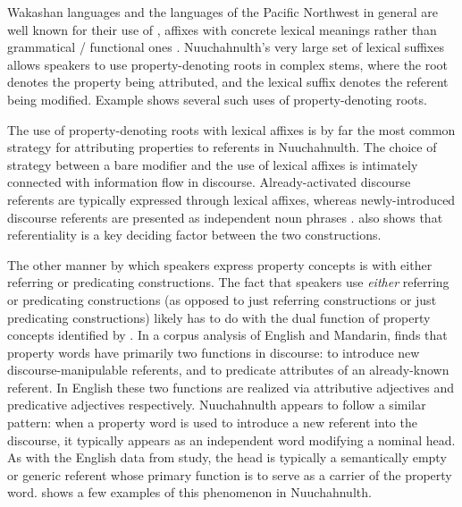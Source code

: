 Wakashan languages and the languages of the Pacific Northwest in general are well known for their use of , affixes with concrete lexical meanings rather than grammatical / functional ones \parencite{Mithun1997}.  Nuuchahnulth's very large set of lexical suffixes allows speakers to use property-denoting roots in complex stems, where the root denotes the property being attributed, and the lexical suffix denotes the referent being modified. Example  shows several such uses of property-denoting roots.


\noindent The use of property-denoting roots with lexical affixes is by far the most common strategy for attributing properties to referents in Nuuchahnulth. The choice of strategy between a bare modifier and the use of lexical affixes is intimately connected with information flow in discourse. Already-activated discourse referents are typically expressed through lexical affixes, whereas newly-introduced discourse referents are presented as independent noun phrases . \textcite[144]{Nakayama2001} also shows that referentiality is a key deciding factor between the two constructions.

The other manner by which speakers express property concepts is with either referring or predicating constructions. The fact that speakers use \emph{either} referring or predicating constructions (as opposed to just referring constructions or just predicating constructions) likely has to do with the dual function of property concepts identified by \textcite{Thompson1989}. In a corpus analysis of English and Mandarin, \citeauthor{Thompson1989} finds that property words have primarily two functions in discourse: to introduce new discourse-manipulable referents, and to predicate attributes of an already-known referent. In English these two functions are realized via attributive adjectives and predicative adjectives respectively. Nuuchahnulth appears to follow a similar pattern: when a property word is used to introduce a new referent into the discourse, it typically appears as an independent word modifying a nominal head. As with the English data from  study, the head is typically a semantically empty or generic referent whose primary function is to serve as a carrier of the property word.  shows a few examples of this phenomenon in Nuuchahnulth.

